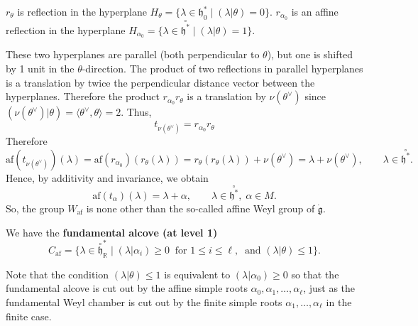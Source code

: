\documentclass[12pt]{article}
\begin{document}
$r_\theta$ is reflection in the hyperplane $H_\theta = \{\lambda \in \mathfrak{h}_0^* \mid (\lambda|\theta)=0\}$. $r_{\alpha_0}$ is an affine reflection in the hyperplane $H_{\alpha_0} = \{\lambda \in \overset{\circ}{\mathfrak{h}^*} \mid (\lambda|\theta)=1\}$.

These two hyperplanes are parallel (both perpendicular to $ \theta $), but one is shifted by 1 unit in the $\theta$-direction. The product of two reflections in parallel hyperplanes is a translation by twice the perpendicular distance vector between the hyperplanes. Therefore the product $r_{\alpha_0} r_\theta$ is a translation by $\nu(\theta^\vee)$ since $(\nu(\theta^\vee)|\theta) = \langle \theta^\vee, \theta \rangle = 2$. Thus,
\[t_{\nu(\theta^\vee)} = r_{\alpha_0} r_\theta\]
Therefore
\[
    \mathrm{af}(t_{\nu(\theta^\vee)})(\lambda) 
    = \mathrm{af}(r_{\alpha_0})(r_\theta(\lambda)) = r_\theta(r_\theta(\lambda)) + \nu(\theta^\vee)
    = \lambda + \nu(\theta^\vee), \qquad \lambda \in \overset{\circ}{\mathfrak{h}^*}.
\]
Hence, by additivity and invariance, we obtain
\begin{equation} \label{6.6.3}
    \mathrm{af}(t_\alpha)(\lambda) = \lambda + \alpha, 
    \qquad \lambda \in \overset{\circ}{\mathfrak{h}^*}, \; \alpha \in M.
\end{equation}
So, the group $W_{\mathrm{af}}$ is none other than the so-called affine Weyl group of $\dot{\mathfrak{g}}$.

\begin{definition}
We have the \textbf{fundamental alcove (at level 1)}
\[
C_{\mathrm{af}} = \{ \lambda \in \overset{\circ}{\mathfrak{h}}^*_{\mathbb{R}} \mid 
(\lambda|\alpha_i) \geq 0 \;\; \text{for } 1 \leq i \leq \ell,\;\; 
\text{and } (\lambda|\theta) \leq 1 \}.
\]
\end{definition}
Note that the condition $(\lambda | \theta ) \leq 1$ is equivalent to $(\lambda | \alpha_0) \geq 0$ so that the fundamental alcove is cut out by the affine simple roots $\alpha_0, \alpha_1, \ldots, \alpha_\ell$, just as the fundamental Weyl chamber is cut out by the finite simple roots $\alpha_1, \ldots, \alpha_\ell$ in the finite case.
\end{document}
